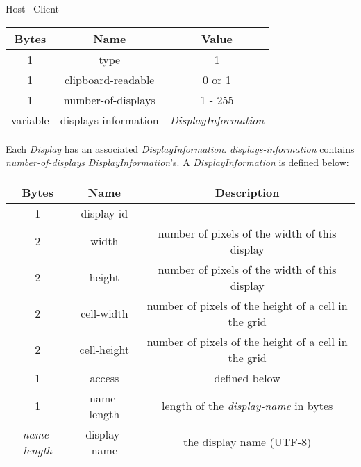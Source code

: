 \begin{center}
    Host \textrightarrow\ Client\\
    \begin{tabular}{|c|c|c|}
        \hline
        \textbf{Bytes} & \textbf{Name}        & \textbf{Value}            \\
        \hline
        1              & type                 & 1                         \\
        \hline
        1              & clipboard-readable   & 0 or 1                    \\
        \hline
        1              & number-of-displays   & 1 - 255                   \\
        \hline
        variable       & displays-information & \emph{DisplayInformation} \\
        \hline
    \end{tabular}
\end{center}

Each \emph{Display} has an associated \emph{DisplayInformation}. \emph{displays-information} contains
\emph{number-of-displays} \emph{DisplayInformation}'s. A \emph{DisplayInformation} is defined below:

\begin{center}
    \begin{tabular}{|c|c|c|}
        \hline
        \textbf{Bytes}     & \textbf{Name} & \textbf{Description}                                 \\
        \hline
        1                  & display-id    &                                                      \\
        \hline
        2                  & width         & number of pixels of the width of this display        \\
        \hline
        2                  & height        & number of pixels of the width of this display        \\
        \hline
        2                  & cell-width    & number of pixels of the height of a cell in the grid \\
        \hline
        2                  & cell-height   & number of pixels of the height of a cell in the grid \\
        \hline
        1                  & access        & defined below                                        \\
        \hline
        1                  & name-length   & length of the \emph{display-name} in bytes           \\
        \hline
        \emph{name-length} & display-name  & the display name (UTF-8)                             \\
        \hline
    \end{tabular}
\end{center}

